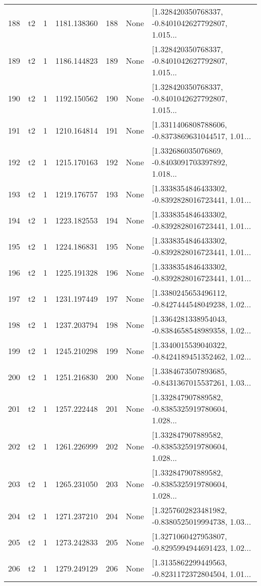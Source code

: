 \begin{tabular}{lllrlll}
188 &  t2 &   1 &  1181.138360 &  188 &  None &  [1.328420350768337, -0.8401042627792807, 1.015... \\
189 &  t2 &   1 &  1186.144823 &  189 &  None &  [1.328420350768337, -0.8401042627792807, 1.015... \\
190 &  t2 &   1 &  1192.150562 &  190 &  None &  [1.328420350768337, -0.8401042627792807, 1.015... \\
191 &  t2 &   1 &  1210.164814 &  191 &  None &  [1.3311406808788606, -0.8373869631044517, 1.01... \\
192 &  t2 &   1 &  1215.170163 &  192 &  None &  [1.332686035076869, -0.8403091703397892, 1.018... \\
193 &  t2 &   1 &  1219.176757 &  193 &  None &  [1.3338354846433302, -0.8392828016723441, 1.01... \\
194 &  t2 &   1 &  1223.182553 &  194 &  None &  [1.3338354846433302, -0.8392828016723441, 1.01... \\
195 &  t2 &   1 &  1224.186831 &  195 &  None &  [1.3338354846433302, -0.8392828016723441, 1.01... \\
196 &  t2 &   1 &  1225.191328 &  196 &  None &  [1.3338354846433302, -0.8392828016723441, 1.01... \\
197 &  t2 &   1 &  1231.197449 &  197 &  None &  [1.3380245653496112, -0.8427444548049238, 1.02... \\
198 &  t2 &   1 &  1237.203794 &  198 &  None &  [1.3364281338954043, -0.8384658548989358, 1.02... \\
199 &  t2 &   1 &  1245.210298 &  199 &  None &  [1.3340015539040322, -0.8424189451352462, 1.02... \\
200 &  t2 &   1 &  1251.216830 &  200 &  None &  [1.3384673507893685, -0.8431367015537261, 1.03... \\
201 &  t2 &   1 &  1257.222448 &  201 &  None &  [1.332847907889582, -0.8385325919780604, 1.028... \\
202 &  t2 &   1 &  1261.226999 &  202 &  None &  [1.332847907889582, -0.8385325919780604, 1.028... \\
203 &  t2 &   1 &  1265.231050 &  203 &  None &  [1.332847907889582, -0.8385325919780604, 1.028... \\
204 &  t2 &   1 &  1271.237210 &  204 &  None &  [1.3257602823481982, -0.8380525019994738, 1.03... \\
205 &  t2 &   1 &  1273.242833 &  205 &  None &  [1.3271060427953807, -0.8295994944691423, 1.02... \\
206 &  t2 &   1 &  1279.249129 &  206 &  None &  [1.3135862299449563, -0.8231172372804504, 1.01... \\

\end{tabular}
